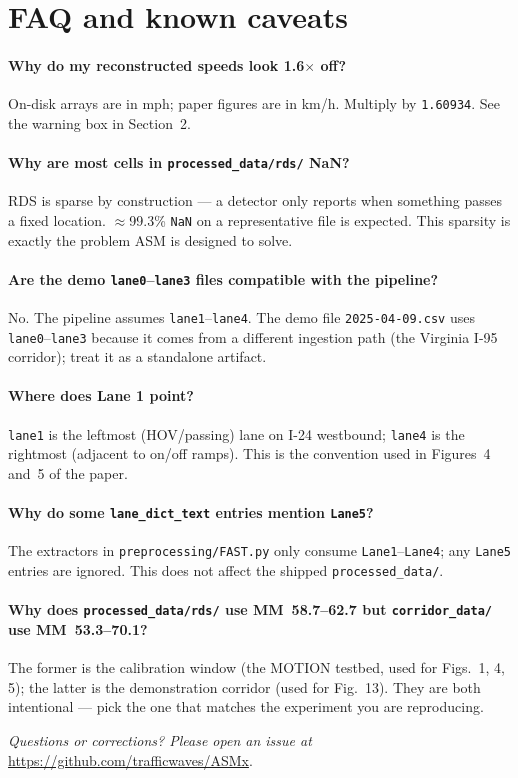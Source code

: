 \documentclass[11pt]{article}
\newcommand{\code}[1]{\texttt{#1}}
\newcommand{\nan}{\code{NaN}}
\newcommand{\filename}[1]{\textcolor{accent}{\code{#1}}}
\begin{document}
\section{FAQ and known caveats}
\label{sec:faq}

\paragraph{Why do my reconstructed speeds look 1.6$\times$ off?}
On-disk arrays are in mph; paper figures are in km/h. Multiply by
\code{1.60934}. See the warning box in Section~2.

\paragraph{Why are most cells in \code{processed\_data/rds/} NaN?}
RDS is sparse by construction --- a detector only reports when something
passes a fixed location. $\approx$99.3\% \nan{} on a representative file is
expected. This sparsity is exactly the problem ASM is designed to solve.

\paragraph{Are the demo \code{lane0}--\code{lane3} files compatible with the
pipeline?}
No. The pipeline assumes \code{lane1}--\code{lane4}. The demo file
\filename{2025-04-09.csv} uses \code{lane0}--\code{lane3} because it comes
from a different ingestion path (the Virginia I-95 corridor); treat it as a
standalone artifact.

\paragraph{Where does Lane 1 point?}
\code{lane1} is the leftmost (HOV/passing) lane on I-24 westbound;
\code{lane4} is the rightmost (adjacent to on/off ramps). This is the
convention used in Figures~4 and~5 of the paper.

\paragraph{Why do some \code{lane\_dict\_text} entries mention \code{Lane5}?}
The extractors in \filename{preprocessing/FAST.py} only consume
\code{Lane1}--\code{Lane4}; any \code{Lane5} entries are ignored. This does
not affect the shipped \code{processed\_data/}.

\paragraph{Why does \code{processed\_data/rds/} use MM~58.7--62.7 but
\code{corridor\_data/} use MM~53.3--70.1?}
The former is the calibration window (the MOTION testbed, used for Figs.~1,
4, 5); the latter is the demonstration corridor (used for Fig.~13). They are
both intentional --- pick the one that matches the experiment you are
reproducing.
\begin{center}
\emph{Questions or corrections? Please open an issue at}
\url{https://github.com/trafficwaves/ASMx}.
\end{center}
\end{document}
